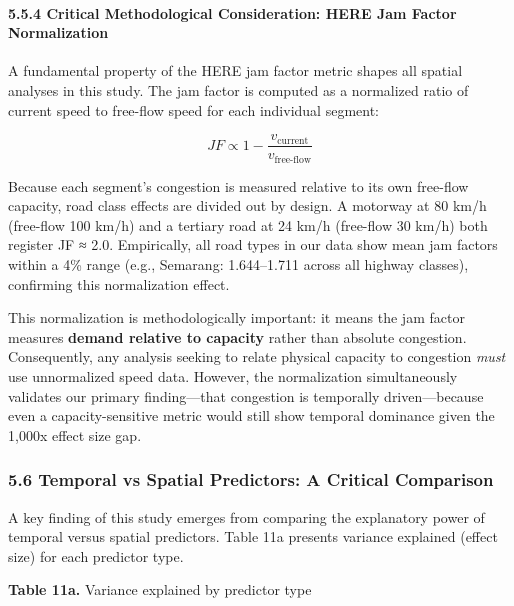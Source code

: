 \paragraph{5.5.4 Critical Methodological Consideration: HERE Jam Factor Normalization}\label{critical-methodological-consideration-here-jam-factor-normalization}

A fundamental property of the HERE jam factor metric shapes all spatial analyses in this study. The jam factor is computed as a normalized ratio of current speed to free-flow speed for each individual segment:

\[JF \propto 1 - \frac{v_{\text{current}}}{v_{\text{free-flow}}}\]

Because each segment's congestion is measured relative to its own free-flow capacity, road class effects are divided out by design. A motorway at 80 km/h (free-flow 100 km/h) and a tertiary road at 24 km/h (free-flow 30 km/h) both register JF ≈ 2.0. Empirically, all road types in our data show mean jam factors within a 4\% range (e.g., Semarang: 1.644--1.711 across all highway classes), confirming this normalization effect.

This normalization is methodologically important: it means the jam factor measures \textbf{demand relative to capacity} rather than absolute congestion. Consequently, any analysis seeking to relate physical capacity to congestion \emph{must} use unnormalized speed data. However, the normalization simultaneously validates our primary finding---that congestion is temporally driven---because even a capacity-sensitive metric would still show temporal dominance given the 1,000x effect size gap.

\subsubsection{5.6 Temporal vs Spatial Predictors: A Critical Comparison}\label{temporal-vs-spatial-predictors-a-critical-comparison}

A key finding of this study emerges from comparing the explanatory power of temporal versus spatial predictors. Table 11a presents variance explained (effect size) for each predictor type.

\textbf{Table 11a.} Variance explained by predictor type

